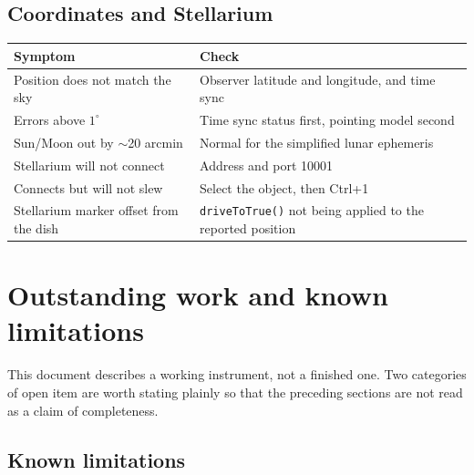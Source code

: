 \documentclass[11pt,a4paper]{article}
\begin{document}
\subsection{Coordinates and Stellarium}

\begin{table}[H]
\centering
\small
\begin{tabular}{p{5.4cm}p{9.2cm}}
\toprule
\textbf{Symptom} & \textbf{Check} \\
\midrule
Position does not match the sky & Observer latitude and longitude, and time sync \\
Errors above $1^\circ$ & Time sync status first, pointing model second \\
Sun/Moon out by $\sim$20 arcmin & Normal for the simplified lunar ephemeris \\
Stellarium will not connect & Address and port 10001 \\
Connects but will not slew & Select the object, then Ctrl+1 \\
Stellarium marker offset from the dish & \texttt{driveToTrue()} not being applied to the reported position \\
\bottomrule
\end{tabular}
\end{table}

\section{Outstanding work and known limitations}
\label{sec:outstanding}

This document describes a working instrument, not a finished one. Two categories of open item are worth stating plainly so that the preceding sections are not read as a claim of completeness.

\subsection{Known limitations}
\end{document}
